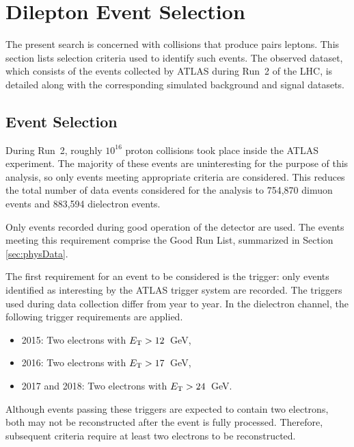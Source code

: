 \section{Dilepton Event Selection}\label{sec:ciEvSel}
The present search is concerned with collisions that produce pairs leptons.
This section lists selection criteria used to identify such events.
The observed dataset, which consists of the events collected by ATLAS during  Run~2 of the LHC, is detailed along with the corresponding simulated background and signal datasets.


\subsection{Event Selection}
During Run~2, roughly $10^{16}$ proton collisions took place inside the ATLAS experiment.
The majority of these events are uninteresting for the purpose of this analysis, so only events meeting appropriate criteria are considered.
This reduces the total number of data events considered for the analysis to 754,870 dimuon events and 883,594 dielectron events.

Only events recorded during good operation of the detector are used.
The events meeting this requirement comprise the Good Run List, summarized in Section \ref{sec:physData}.

The first requirement for an event to be considered is the trigger: only events identified as interesting by the ATLAS trigger system are recorded.
The triggers used during data collection differ from year to year. 
In the dielectron channel, the following trigger requirements are applied.
\begin{itemize}
	\item 2015: Two electrons with $E_\text{T}>12$~GeV,
	\item 2016: Two electrons with $E_\text{T}>17$~GeV,
	\item 2017 and 2018: Two electrons with $E_\text{T}>24$~GeV.
\end{itemize}
Although events passing these triggers are expected to contain two electrons, both may not be reconstructed after the event is fully processed. 
Therefore, subsequent criteria require at least two electrons to be reconstructed.

